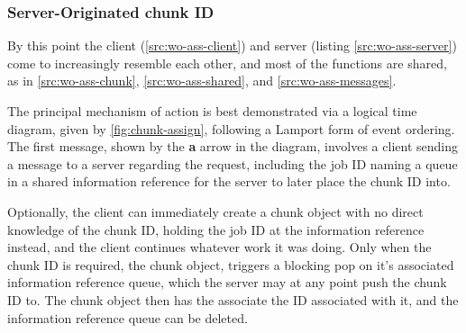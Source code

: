 
\subsubsection{Server-Originated chunk ID}

By this point the client (\cref{src:wo-ass-client}) and server (listing
\cref{src:wo-ass-server}) come to increasingly resemble each other, and most of
the functions are shared, as in \cref{src:wo-ass-chunk},
\cref{src:wo-ass-shared}, and \cref{src:wo-ass-messages}.


The principal mechanism of action is best demonstrated via a logical time
diagram, given by \cref{fig:chunk-assign}, following a Lamport form of
event ordering\cite{lamport1978ordering}.
The first message, shown by the \textbf{a} arrow in the diagram, involves a
client sending a message to a server regarding the request, including the job
ID naming a queue in a shared information reference for the server to later
place the chunk ID into.

Optionally, the client can immediately create a chunk object with no direct
knowledge of the chunk ID, holding the job ID at the information reference
instead, and the client continues whatever work it was doing.
Only when the chunk ID is required, the chunk object, triggers a blocking pop
on it's associated information reference queue, which the server may
at any point push the chunk ID to.
The chunk object then has the associate the ID associated with it, and the
information reference queue can be deleted.


